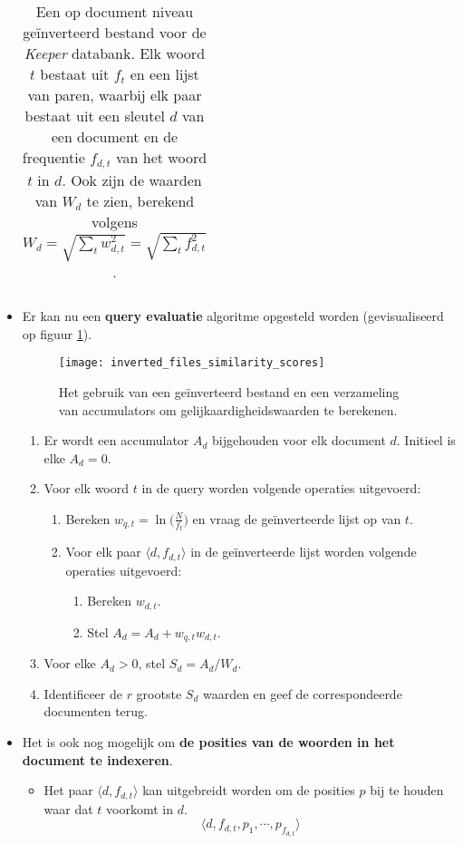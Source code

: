 \begin{itemize}
\begin{table}[ht]
\begin{tabular}{c |c c c c c c}
        \end{tabular}
        \caption{Een op document niveau geïnverteerd bestand voor de \textit{Keeper} databank. Elk woord $t$ bestaat uit $f_t$ en een lijst van paren, waarbij elk paar bestaat uit een sleutel $d$ van een document en de frequentie $f_{d, t}$ van het woord $t$ in $d$. Ook zijn de waarden van $W_d$ te zien, berekend volgens $W_d = \sqrt{\sum_t w^2_{d, t}} = \sqrt{\sum_t f^2_{d, t}}$.}
        \label{table:inverted_file_keeper}
    \end{table}
    \item Er kan nu een \textbf{query evaluatie} algoritme opgesteld worden (gevisualiseerd op figuur \ref{fig:inverted_files_similarity_scores}).
    \begin{figure}[ht]
        \centering
        \texttt{[image: inverted\_files\_similarity\_scores]}
        \caption{Het gebruik van een geïnverteerd bestand en een verzameling van accumulators om gelijkaardigheidswaarden te berekenen.}
        \label{fig:inverted_files_similarity_scores}
    \end{figure}
    \begin{enumerate}
        \item Er wordt een accumulator $A_d$ bijgehouden voor elk document $d$. Initieel is elke $A_d = 0$.
        \item Voor elk woord $t$ in de query worden volgende operaties uitgevoerd:
        \begin{enumerate}
            \item Bereken $w_{q, t} = \ln\bigg(\frac{N}{f_t}\bigg)$ en vraag de geïnverteerde lijst op van $t$.
            \item Voor elk paar $\langle d, f_{d,t} \rangle$ in de geïnverteerde lijst worden volgende operaties uitgevoerd:
            \begin{enumerate}
                \item Bereken $w_{d, t}$.
                \item Stel  $A_d = A_d + w_{q,t}w_{d,t}$.
            \end{enumerate}
        \end{enumerate}
        \item Voor elke $A_d > 0$, stel $S_d = A_d/W_d$.
        \item Identificeer de $r$ grootste $S_d$ waarden en geef de correspondeerde documenten terug.
    \end{enumerate}
    
    \item Het is ook nog mogelijk om \textbf{de posities van de woorden in het document te indexeren}.
    \begin{itemize}
        \item Het paar $\langle d, f_{d,t}\rangle$ kan uitgebreidt worden om de posities $p$ bij te houden waar dat $t$ voorkomt in $d$.
        $$\langle d, f_{d, t}, p_1, \cdots, p_{f_{d,t}}\rangle$$
    \end{itemize}
\end{itemize}

